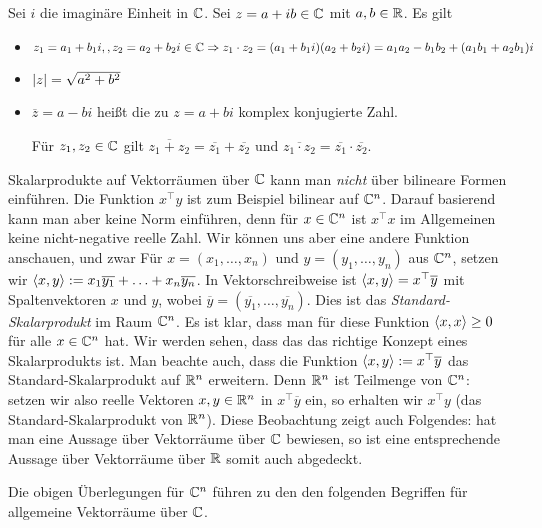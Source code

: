 \begin{tcolorbox}
	\begin{wdh}
		Sei $i$ die imaginäre Einheit in $\mathbb C$. 
		Sei $ z = a + i b \in \mathbb C $ mit $ a,b \in \mathbb R $. Es gilt 
		\begin{itemize}
			\item
				$ z_1 = a_1 + b_1i, ,z_2 = a_2 + b_2 i\in \mathbb C \Rightarrow z_1 \cdot z_2 = (a_1 + b_1i)(a_2 + b_2i)  = a_1 a_2 - b_1 b_2 + (a_1 b_1 + a_2 b_1) i$
			\item
				$ \left| z \right| = \sqrt{a^2+b^2} $
			\item
				$ \overline{z} = a-bi $ heißt die zu $ z = a+bi $ komplex konjugierte Zahl.
				
				Für $ z_1,z_2 \in \mathbb C $ gilt $ \overline{z_1+z_2} = \overline{z_1} + \overline{z_2} $ und $ \overline{z_1 \cdot z_2} = \overline{z_1} \cdot \overline{z_2} $.
		\end{itemize}
	\end{wdh}
\end{tcolorbox}

\noindent Skalarprodukte auf Vektorräumen über $ \mathbb C $ kann man \emph{nicht} über bilineare Formen einführen. Die Funktion $x^\top y$ ist zum Beispiel bilinear auf $\mathbb C^n$. Darauf basierend kann man aber keine Norm einführen,
 denn für $ x \in \mathbb C^n $ ist $ x^\top x $ im Allgemeinen keine nicht-negative reelle Zahl. Wir können uns aber eine andere Funktion anschauen, und zwar 
Für $ x = (x_1, \ldots, x_n) $ und $ y = (y_1, \ldots, y_n) $ aus $ \mathbb C^n $, setzen wir $ \left\langle x,y \right\rangle := x_1\overline{y_1} + \ldots + x_n \overline{y_n} $. In Vektorschreibweise ist $ \left\langle x,y \right\rangle = x^\top \overline{y} $ mit Spaltenvektoren $ x $ und $ y $, wobei $ \overline{y} = (\overline{y_1}, \ldots, \overline{y_n}) $. Dies ist das \emph{Standard-Skalarprodukt} im Raum $\mathbb C^n$. Es ist klar, dass man für diese Funktion $\left\langle x,x \right\rangle \ge 0$ für alle $x \in \mathbb C^n$ hat. Wir werden sehen, dass das das richtige Konzept eines Skalarprodukts ist. Man beachte auch, dass die Funktion $\left\langle x,y \right\rangle := x^\top \overline{y}$ das Standard-Skalarprodukt auf $\mathbb R^n$ erweitern. Denn $\mathbb R^n$ ist Teilmenge von $\mathbb C^n$: setzen wir also reelle Vektoren $x,y \in \mathbb R^n$ in $x^\top \overline{y}$ ein, so erhalten wir $x^\top y$ (das Standard-Skalarprodukt von $\mathbb R^n$). Diese Beobachtung zeigt auch Folgendes: hat man eine Aussage über Vektorräume über $\mathbb C$ bewiesen, so ist eine entsprechende Aussage über Vektorräume über $\mathbb R$ somit auch abgedeckt. 

Die obigen Überlegungen für $\mathbb C^n$ führen zu den den folgenden Begriffen für allgemeine Vektorräume über $\mathbb C$. 

